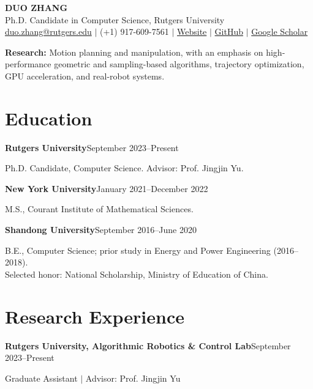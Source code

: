 \documentclass[11pt,letterpaper]{article}
\newcommand{\entry}[2]{\Needspace{6\baselineskip}\textbf{#1}\hfill #2\par}
\begin{document}
\begin{center}
  {\LARGE\bfseries DUO ZHANG}\\[5pt]
  Ph.D. Candidate in Computer Science, Rutgers University\\[3pt]
  \href{mailto:duo.zhang@rutgers.edu}{duo.zhang@rutgers.edu}
  \enspace $\vert$ \enspace (+1) 917-609-7561
  \enspace $\vert$ \enspace
  \href{https://duozhangrobotics.github.io/}{Website}
  \enspace $\vert$ \enspace
  \href{https://github.com/DuoZhangRobotics}{GitHub}
  \enspace $\vert$ \enspace
  \href{https://scholar.google.com/citations?user=bmEZlbkAAAAJ}{Google Scholar}
\end{center}

\textbf{Research:} Motion planning and manipulation, with an emphasis on
high-performance geometric and sampling-based algorithms, trajectory optimization,
GPU acceleration, and real-robot systems.

\section*{Education}
\entry{Rutgers University}{September 2023--Present}
Ph.D. Candidate, Computer Science. Advisor: Prof. Jingjin Yu.

\entry{New York University}{January 2021--December 2022}
M.S., Courant Institute of Mathematical Sciences.

\entry{Shandong University}{September 2016--June 2020}
B.E., Computer Science; prior study in Energy and Power Engineering (2016--2018).
\\Selected honor: National Scholarship, Ministry of Education of China.

\section*{Research Experience}
\entry{Rutgers University, Algorithmic Robotics \& Control Lab}{September 2023--Present}
Graduate Assistant \enspace $\vert$ \enspace Advisor: Prof. Jingjin Yu
\end{document}
